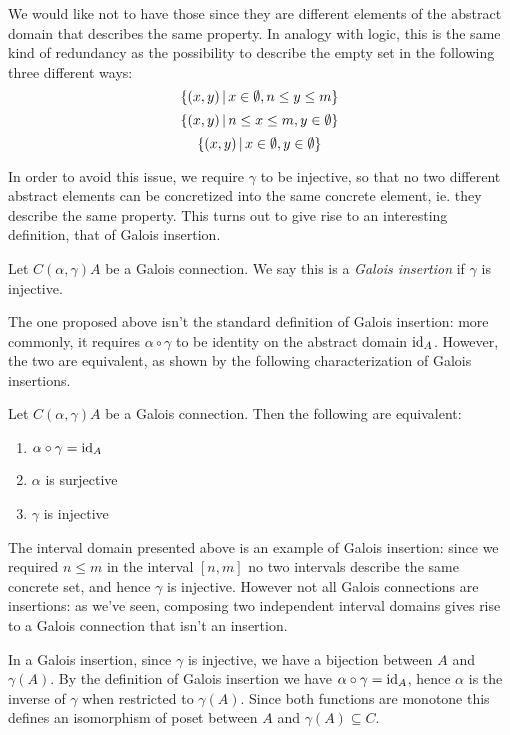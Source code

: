 We would like not to have those since they are different elements of the abstract domain that describes the same property. In analogy with logic, this is the same kind of redundancy as the possibility to describe the empty set in the following three different ways:
\[
\{ (x, y) \,\vert\, x \in \emptyset, n \le y \le m \}
\]
\[
\{ (x, y) \,\vert\, n \le x \le m, y \in \emptyset \}
\]
\[
\{ (x, y) \,\vert\, x \in \emptyset, y \in \emptyset \}
\]

In order to avoid this issue, we require $\gamma$ to be injective, so that no two different abstract elements can be concretized into the same concrete element, ie. they describe the same property. This turns out to give rise to an interesting definition, that of Galois insertion.
\begin{definition}\label{ch2:def:gi}
	Let $C (\alpha, \gamma) A$ be a Galois connection. We say this is a \textit{Galois insertion} if $\gamma$ is injective.
\end{definition}

The one proposed above isn't the standard definition of Galois insertion: more commonly, it requires $\alpha \circ \gamma$ to be identity on the abstract domain $\text{id}_A$. However, the two are equivalent, as shown by the following characterization of Galois insertions.
\begin{prop}\label{ch2:th:gi-charact}
	Let $C (\alpha, \gamma) A$ be a Galois connection. Then the following are equivalent:
	\begin{enumerate}[label={(\arabic*)}]
		\item $\alpha \circ \gamma = \text{id}_A$
		\item $\alpha$ is surjective
		\item $\gamma$ is injective
	\end{enumerate}
\end{prop}

The interval domain presented above is an example of Galois insertion: since we required $n \le m$ in the interval $[n, m]$ no two intervals describe the same concrete set, and hence $\gamma$ is injective. However not all Galois connections are insertions: as we've seen, composing two independent interval domains gives rise to a Galois connection that isn't an insertion.

In a Galois insertion, since $\gamma$ is injective, we have a bijection between $A$ and $\gamma(A)$. By the definition of Galois insertion we have $\alpha \circ \gamma = \text{id}_A$, hence $\alpha$ is the inverse of $\gamma$ when restricted to $\gamma(A)$. Since both functions are monotone this defines an isomorphism of poset between $A$ and $\gamma(A) \subseteq C$.

